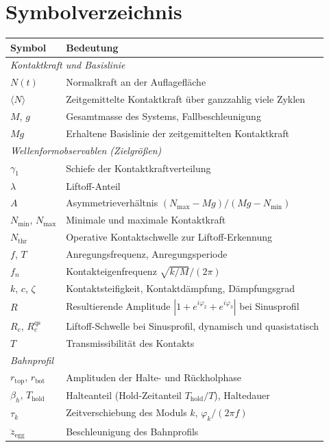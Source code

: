 \documentclass[12pt,a4paper]{report}
\begin{document}
\clearpage

\chapter*{Symbolverzeichnis}

\begin{longtable}{@{}p{}p{}@{}}
\textbf{Symbol} & \textbf{Bedeutung} \\ \hline
\endhead

\multicolumn{2}{l}{\emph{Kontaktkraft und Basislinie}} \\
$N(t)$ & Normalkraft an der Auflagefläche \\
$\langle N \rangle$ & Zeitgemittelte Kontaktkraft über ganzzahlig viele Zyklen \\
$M$, $g$ & Gesamtmasse des Systems, Fallbeschleunigung \\
$Mg$ & Erhaltene Basislinie der zeitgemittelten Kontaktkraft \\

\multicolumn{2}{l}{\emph{Wellenformobservablen (Zielgrößen)}} \\
$\gamma_1$ & Schiefe der Kontaktkraftverteilung \\
$\lambda$ & Liftoff-Anteil \\
$A$ & Asymmetrieverhältnis $(N_{\max}-Mg)/(Mg-N_{\min})$ \\
$N_{\min}$, $N_{\max}$ & Minimale und maximale Kontaktkraft \\
$N_{\text{thr}}$ & Operative Kontaktschwelle zur Liftoff-Erkennung \\
$f$, $T$ & Anregungsfrequenz, Anregungsperiode \\
$f_n$ & Kontakteigenfrequenz $\sqrt{k/M}/(2\pi)$ \\
$k$, $c$, $\zeta$ & Kontaktsteifigkeit, Kontaktdämpfung, Dämpfungsgrad \\
$R$ & Resultierende Amplitude $|1+e^{i\varphi_2}+e^{i\varphi_3}|$ bei Sinusprofil \\
$R_c$, $R_c^{\text{qs}}$ & Liftoff-Schwelle bei Sinusprofil, dynamisch und quasistatisch \\
$T$ & Transmissibilität des Kontakts \\

\multicolumn{2}{l}{\emph{Bahnprofil}} \\
$r_{\text{top}}$, $r_{\text{bot}}$ & Amplituden der Halte- und Rückholphase \\
$\beta_h$, $T_{\text{hold}}$ & Halteanteil (Hold-Zeitanteil $T_{\text{hold}}/T$), Haltedauer \\
$\tau_k$ & Zeitverschiebung des Moduls $k$, $\varphi_k/(2\pi f)$ \\
$\ddot{z}_{\text{egg}}$ & Beschleunigung des Bahnprofils \\


\end{longtable}
\end{document}
